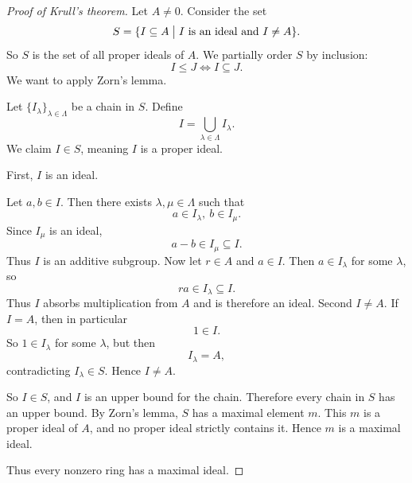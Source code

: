 \begin{proof}[Proof of Krull's theorem]
    Let $A \neq 0$. Consider the set 
    \[
        S = \{I \subseteq A \bigm| I \ \text{is an ideal and} \ 
        I \neq A\}.
    \]
    So $S$ is the set of all proper ideals of $A$. 
    We partially order $S$ by inclusion: 
    \[
        I \leq J \Leftrightarrow I \subseteq J. 
    \]
    We want to apply Zorn's lemma. 

    Let $\{I_\lambda\}_{\lambda \in \Lambda}$ be a chain in 
    $S$. Define 
    \[
        I = \bigcup_{\lambda \in \Lambda} I_\lambda.
    \]
    We claim $I \in S$, meaning $I$ is a proper ideal. 

    First, $I$ is an ideal. 

    Let $a,b \in I$. Then there exists $\lambda, \mu \in \Lambda$ 
    such that 
    \[
        a \in I_\lambda, \ b \in I_\mu. 
    \]
    Since $I_\mu$ is an ideal, 
    \[
        a - b \in I_\mu \subseteq I. 
    \]
    Thus $I$ is an additive subgroup. 
    Now let $r \in A$ and $a \in I$. Then $a \in I_\lambda$ for 
    some $\lambda$, so 
    \[
        ra \in I_\lambda \subseteq I. 
    \]
    Thus $I$ absorbs multiplication from $A$ and is therefore 
    an ideal. Second $I \neq A$. 
    If $I = A$, then in particular 
    \[
        1 \in I.
    \]
    So $1 \in I_\lambda$ for some $\lambda$, but then 
    \[
        I_\lambda = A,
    \]
    contradicting $I_\lambda \in S$. Hence $I \neq A$. 

    So $I \in S$, and $I$ is an upper bound for the chain. 
    Therefore every chain in $S$ has an upper bound. 
    By Zorn's lemma, $S$ has a maximal element $m$. 
    This $m$ is a proper ideal of $A$, and no proper ideal 
    strictly contains it. Hence $m$ is a maximal ideal. 

    Thus every nonzero ring has a maximal ideal. 
\end{proof}

